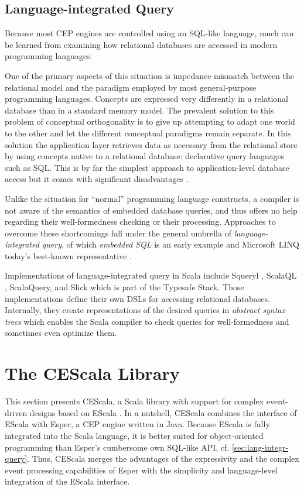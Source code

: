 \documentclass[book,type=bsc,colorback,accentcolor=tud8b,12pt,twoside]{tudthesis}
\begin{document}
\section{Language-integrated Query}
\label{sec:lang-integr-query}

Because most CEP engines are controlled using an SQL-like language, much can be learned from examining how relational databases are accessed in modern programming languages.

One of the primary aspects of this situation is impedance mismatch between the relational model and the paradigm employed by most general-purpose programming languages.  Concepts are expressed very differently in a relational database than in a standard memory model.  The prevalent solution to this problem of conceptual orthogonality is to give up attempting to adapt one world to the other and let the different conceptual paradigms remain separate.  In this solution the application layer retrieves data as necessary from the relational store by using concepts native to a relational database: declarative query languages such as SQL.  This is by far the simplest approach to application-level database access but it comes with significant disadvantages \cite{spiewak2009scalaql}.  

Unlike the situation for “normal” programming language constructs, a compiler is not aware of the semantics of embedded database queries, and thus offers no help regarding their well-formedness checking or their processing.  Approaches to overcome these shortcomings fall under the general umbrella of \emph{language-integrated query}, of which \emph{embedded SQL} is an early example and Microsoft LINQ today’s best-known representative \cite{garcia2010extending}.  

Implementations of language-integrated query in Scala include Squeryl \cite{Squeryl}, ScalaQL \cite{spiewak2009scalaql}, ScalaQuery, and Slick which is part of the Typesafe Stack.  Those implementations define their own DSLs for accessing relational databases.  Internally, they create representations of the desired queries in \emph{abstract syntax trees} which enables the Scala compiler to check queries for well-formedness and sometimes even optimize them.  

\chapter{The CEScala Library}
\label{sec:cescala-library}

This section presents CEScala, a Scala library with support for complex event-driven designs based on EScala \cite{Gasiunas:2011gg}.  In a nutshell, CEScala combines the interface of EScala with Esper, a CEP engine written in Java.  Because EScala is fully integrated into the Scala language, it is better suited for object-oriented programming than Esper's cumbersome own SQL-like API, cf. \autoref{sec:lang-integr-query}.  Thus, CEScala merges the advantages of the expressivity and the complex event processing capabilities of Esper with the simplicity and language-level integration of the EScala interface.  
\end{document}
